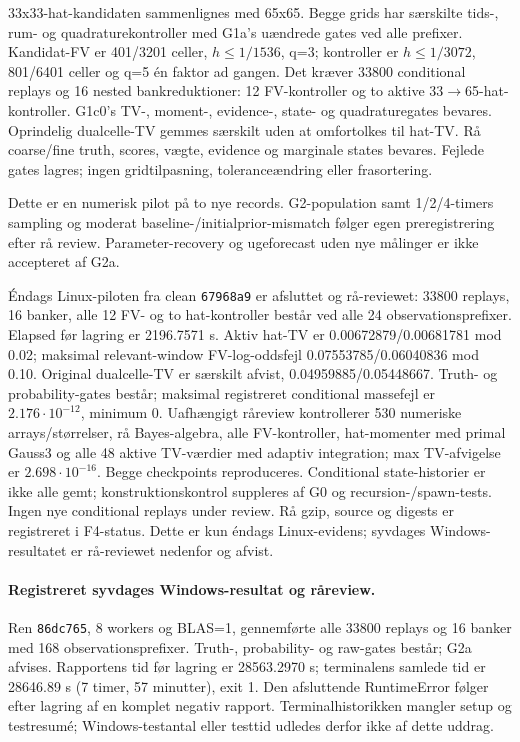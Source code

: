 33x33-hat-kandidaten sammenlignes med 65x65. Begge grids har særskilte
tids-, rum- og quadraturekontroller med G1a's uændrede gates ved alle prefixer.
Kandidat-FV er 401/3201 celler, \(h\le1/1536\), q=3;
kontroller er \(h\le1/3072\), 801/6401 celler og q=5 én faktor ad gangen.
Det kræver 33800 conditional replays og 16 nested bankreduktioner:
12 FV-kontroller og to aktive 33\(\to\)65-hat-kontroller.
G1c0's TV-, moment-, evidence-, state- og quadraturegates bevares.
Oprindelig dualcelle-TV gemmes særskilt uden at omfortolkes til hat-TV.
Rå coarse/fine truth, scores, vægte, evidence og marginale states bevares.
Fejlede gates lagres; ingen gridtilpasning, toleranceændring eller frasortering.

Dette er en numerisk pilot på to nye records. G2-population samt
1/2/4-timers sampling og moderat baseline-/initialprior-mismatch følger
egen preregistrering efter rå review. Parameter-recovery og ugeforecast
uden nye målinger er ikke accepteret af G2a.


Éndags Linux-piloten fra clean \texttt{67968a9} er afsluttet og rå-reviewet:
33800 replays, 16 banker, alle 12 FV- og to hat-kontroller består ved alle
24 observationsprefixer. Elapsed før lagring er 2196.7571 s. Aktiv hat-TV er
0.00672879/0.00681781 mod 0.02; maksimal relevant-window FV-log-oddsfejl
0.07553785/0.06040836 mod 0.10. Original dualcelle-TV er særskilt afvist,
0.04959885/0.05448667. Truth- og probability-gates består; maksimal registreret
conditional massefejl er \(2.176\cdot10^{-12}\), minimum 0. Uafhængigt råreview
kontrollerer 530 numeriske arrays/størrelser, rå Bayes-algebra, alle FV-kontroller,
hat-momenter med primal Gauss3 og alle 48 aktive TV-værdier med adaptiv integration;
max TV-afvigelse er \(2.698\cdot10^{-16}\). Begge checkpoints reproduceres.
Conditional state-historier er ikke alle gemt; konstruktionskontrol suppleres af
G0 og recursion-/spawn-tests. Ingen nye conditional replays under review. Rå gzip,
source og digests er registreret i F4-status. Dette er kun éndags Linux-evidens;
syvdages Windows-resultatet er rå-reviewet nedenfor og afvist.

\paragraph{Registreret syvdages Windows-resultat og råreview.}
Ren \texttt{86dc765}, 8 workers og BLAS=1, gennemførte alle 33800 replays
og 16 banker med 168 observationsprefixer. Truth-, probability- og
raw-gates består; G2a afvises. Rapportens tid før lagring er 28563.2970 s;
terminalens samlede tid er 28646.89 s (7 timer, 57 minutter), exit 1.
Den afsluttende RuntimeError følger efter lagring af en komplet negativ
rapport. Terminalhistorikken mangler setup og testresumé; Windows-testantal
eller testtid udledes derfor ikke af dette uddrag.

